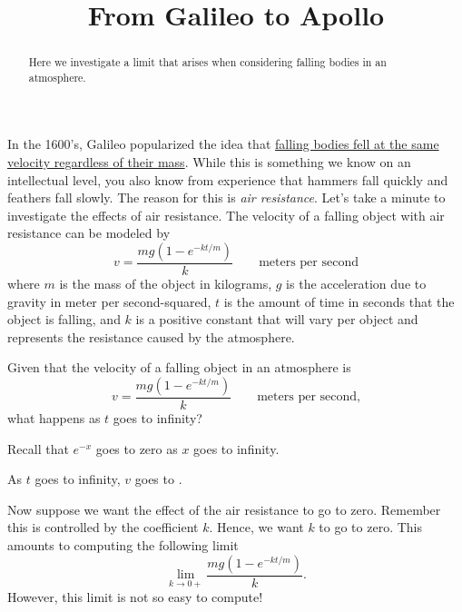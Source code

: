 \documentclass{ximera}
\title[Break-Ground:]{From Galileo to Apollo}
\begin{document}
\begin{abstract}
Here we investigate a limit that arises when considering falling
bodies in an atmosphere.
\end{abstract}
\maketitle



In the 1600's, Galileo popularized the idea that \href{http://en.wikipedia.org/wiki/Galileo%27s_Leaning_Tower_of_Pisa_experiment}{falling bodies fell
at the same velocity regardless of their mass}. While this is something
we know on an intellectual level, you also know from experience that
hammers fall quickly and feathers fall slowly. The reason for this is
\textit{air resistance}.  Let's take a minute to investigate the
effects of air resistance. The velocity of a falling object with air
resistance can be modeled by
\[
v = \frac{mg(1-e^{-kt/m})}{k}\qquad\text{meters per second}
\]
where $m$ is the mass of the object in kilograms, $g$ is the
acceleration due to gravity in meter per second-squared, $t$ is the
amount of time in seconds that the object is falling, and $k$ is a
positive constant that will vary per object and represents the
resistance caused by the atmosphere.

\begin{problem}
Given that the velocity of a falling object in an atmosphere is 
\[
v = \frac{mg(1-e^{-kt/m})}{k}\qquad\text{meters per second,}
\]
what happens as $t$ goes to infinity?
\begin{hint}
Recall that $e^{-x}$ goes to zero as $x$ goes to infinity.
\end{hint}
\begin{prompt}
As $t$ goes to infinity, $v$ goes to .
\end{prompt}
\end{problem}


Now suppose we want the effect of the air resistance to go to
zero. Remember this is controlled by the coefficient $k$. Hence, we
want $k$ to go to zero. This amounts to computing the following limit
\[
\lim_{k\to 0+} \frac{mg(1-e^{-kt/m})}{k}.
\]
However, this limit is not so easy to compute!


\end{document}
